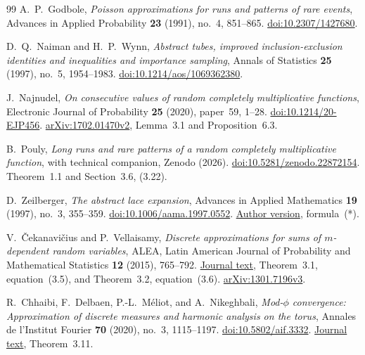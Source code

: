 \begin{thebibliography}{99}
A.~P.~Godbole,
\emph{Poisson approximations for runs and patterns of rare events},
Advances in Applied Probability \textbf{23} (1991), no.~4,
851--865.
\href{https://doi.org/10.2307/1427680}
{doi:10.2307/1427680}.

D.~Q.~Naiman and H.~P.~Wynn,
\emph{Abstract tubes, improved inclusion-exclusion identities
and inequalities and importance sampling},
Annals of Statistics \textbf{25} (1997), no.~5, 1954--1983.
\href{https://doi.org/10.1214/aos/1069362380}
{doi:10.1214/aos/1069362380}.

J.~Najnudel,
\emph{On consecutive values of random completely multiplicative
functions},
Electronic Journal of Probability \textbf{25} (2020), paper~59,
1--28.
\href{https://doi.org/10.1214/20-EJP456}
{doi:10.1214/20-EJP456}.
\href{https://arxiv.org/abs/1702.01470v2}
{arXiv:1702.01470v2}, Lemma~3.1 and Proposition~6.3.

B.~Pouly,
\emph{Long runs and rare patterns of a random completely
multiplicative function}, with technical companion,
Zenodo (2026).
\href{https://doi.org/10.5281/zenodo.22872154}
{doi:10.5281/zenodo.22872154}.
Theorem~1.1 and Section~3.6, (3.22).

D.~Zeilberger,
\emph{The abstract lace expansion},
Advances in Applied Mathematics \textbf{19} (1997),
no.~3, 355--359.
\href{https://doi.org/10.1006/aama.1997.0552}
{doi:10.1006/aama.1997.0552}.
\href{https://sites.math.rutgers.edu/~zeilberg/mamarim/mamarimPDF/lace.pdf}
{Author version}, formula~(*).

V.~\v{C}ekanavi\v{c}ius and P.~Vellaisamy,
\emph{Discrete approximations for sums of $m$-dependent random variables},
ALEA, Latin American Journal of Probability and Mathematical Statistics
\textbf{12} (2015), 765--792.
\href{https://alea.impa.br/articles/v12/12-29.pdf}{Journal text},
Theorem~3.1, equation~(3.5), and Theorem~3.2, equation~(3.6).
\href{https://arxiv.org/abs/1301.7196v3}{arXiv:1301.7196v3}.

R.~Chhaibi, F.~Delbaen, P.-L.~M\'eliot, and A.~Nikeghbali,
\emph{Mod-$\phi$ convergence: Approximation of discrete measures
and harmonic analysis on the torus},
Annales de l'Institut Fourier \textbf{70} (2020),
no.~3, 1115--1197.
\href{https://doi.org/10.5802/aif.3332}{doi:10.5802/aif.3332}.
\href{https://numdam.org/item/10.5802/aif.3332.pdf}{Journal text},
Theorem~3.11.


\end{thebibliography}
